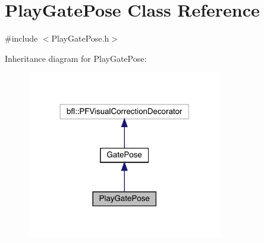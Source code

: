 \hypertarget{classPlayGatePose}{}\section{Play\+Gate\+Pose Class Reference}
\label{classPlayGatePose}


{\ttfamily \#include $<$Play\+Gate\+Pose.\+h$>$}



Inheritance diagram for Play\+Gate\+Pose\+:
\nopagebreak
\begin{figure}[H]
\begin{center}
\leavevmode
\includegraphics[width=242pt]{classPlayGatePose__inherit__graph}
\end{center}
\end{figure}
